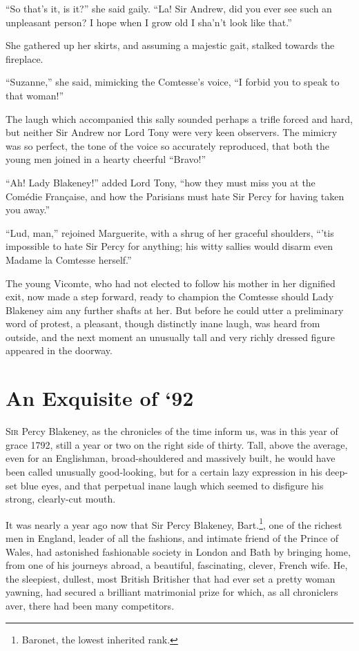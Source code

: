 \documentclass[paper=a5,BCOR=7mm,twoside,DIV=calc,12pt,usegeometry,chapterprefix,endperiod,headings=big]{scrbook}
\begin{document}
\enquote{So that's it, is it?} she said gaily. \enquote{La! Sir Andrew, did you ever see such an unpleasant person? I hope when I grow old I sha'n’t look like that.}

She gathered up her skirts, and assuming a majestic gait, stalked towards the fireplace.

\enquote{Suzanne,} she said, mimicking the Comtesse's voice, \enquote{I forbid you to speak to that woman!}

The laugh which accompanied this sally sounded perhaps a trifle forced and hard, but neither Sir Andrew nor Lord Tony were very keen observers. The mimicry was so perfect, the tone of the voice so accurately reproduced, that both the young men joined in a hearty cheerful \enquote{Bravo!}

\enquote{Ah! Lady Blakeney!} added Lord Tony, \enquote{how they must miss you at the Comédie Française, and how the Parisians must hate Sir Percy for having taken you away.}

\enquote{Lud, man,} rejoined Marguerite, with a shrug of her graceful shoulders, \enquote{’tis impossible to hate Sir Percy for anything; his witty sallies would disarm even Madame la Comtesse herself.}

The young Vicomte, who had not elected to follow his mother in her dignified exit, now made a step forward, ready to champion the Comtesse should Lady Blakeney aim any further shafts at her. But before he could utter a preliminary word of protest, a pleasant, though distinctly inane laugh, was heard from outside, and the next moment an unusually tall and very richly dressed figure appeared in the doorway.

\chapter{An Exquisite of `92}
\lettrine[lines=4]{S}{ir} Percy Blakeney, as the chronicles of the time inform us, was in this year of grace 1792, still a year or two on the right side of thirty. Tall, above the average, even for an Englishman, broad-shouldered and massively built, he would have been called unusually good-looking, but for a certain lazy expression in his deep-set blue eyes, and that perpetual inane laugh which seemed to disfigure his strong, clearly-cut mouth.

It was nearly a year ago now that Sir Percy Blakeney, Bart.\footnote{Baronet, the lowest inherited rank.}, one of the richest men in England, leader of all the fashions, and intimate friend of the Prince of Wales, had astonished fashionable society in London and Bath by bringing home, from one of his journeys abroad, a beautiful, fascinating, clever, French wife. He, the sleepiest, dullest, most British Britisher that had ever set a pretty woman yawning, had secured a brilliant matrimonial prize for which, as all chroniclers aver, there had been many competitors.
\end{document}
